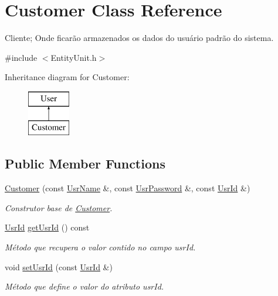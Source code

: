 \hypertarget{classCustomer}{\section{Customer Class Reference}
\label{d9/d12/classCustomer}
}


Cliente; Onde ficarão armazenados os dados do usuário padrão do sistema.  




{\ttfamily \#include $<$Entity\-Unit.\-h$>$}

Inheritance diagram for Customer\-:\begin{figure}[H]
\begin{center}
\leavevmode
\includegraphics[height=2.000000cm]{d9/d12/classCustomer}
\end{center}
\end{figure}
\subsection*{Public Member Functions}
\begin{DoxyCompactItemize}
\item 
\hyperlink{classCustomer_a3f3be282d21b234e1e72f645d8fdc362}{Customer} (const \hyperlink{classUsrName}{Usr\-Name} \&, const \hyperlink{classUsrPassword}{Usr\-Password} \&, const \hyperlink{classUsrId}{Usr\-Id} \&)
\begin{DoxyCompactList}\small\item\em Construtor base de \hyperlink{classCustomer}{Customer}. \end{DoxyCompactList}\item 
\hyperlink{classUsrId}{Usr\-Id} \hyperlink{classCustomer_a76d325591ef27599cb1d7f3e4b77b8d4}{get\-Usr\-Id} () const 
\begin{DoxyCompactList}\small\item\em Método que recupera o valor contido no campo usr\-Id. \end{DoxyCompactList}\item 
void \hyperlink{classCustomer_a89b74269a4750193d61b305b13df82fa}{set\-Usr\-Id} (const \hyperlink{classUsrId}{Usr\-Id} \&)
\begin{DoxyCompactList}\small\item\em Método que define o valor do atributo usr\-Id. \end{DoxyCompactList}\end{DoxyCompactItemize}
